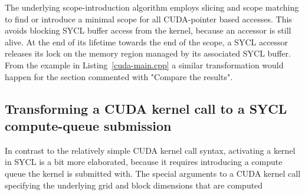 \documentclass[sigconf]{acmart}
\begin{document}
The underlying scope-introduction algorithm employs slicing and scope matching to find or introduce a minimal scope for all CUDA-pointer based accesses. This avoids blocking SYCL buffer access from the kernel, because an accessor is still alive. At the end of its lifetime towards the end of the scope, a SYCL accessor releases its lock on the memory region managed by its associated SYCL buffer. From the example in Listing~\ref{cuda-main.cpp} a similar transformation would happen for the section commented with "Compare the results".

\subsection{Transforming a CUDA kernel call to a SYCL compute-queue submission} 

In contrast to the relatively simple CUDA kernel call syntax, activating a kernel in SYCL is a bit more elaborated, because it requires introducing a compute queue the kernel is submitted with. The special arguments to a CUDA kernel call specifying the underlying grid and block dimensions that are computed 
\end{document}
